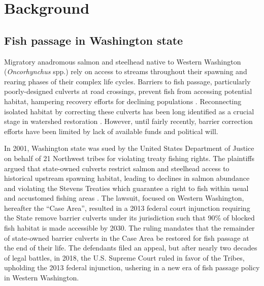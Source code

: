 \documentclass[12pt]{elsarticle}
\begin{document}
\section{Background}

\subsection*{Fish passage in Washington state}

Migratory anadromous salmon and steelhead native to Western Washington (\textit{Oncorhynchus} spp.) rely on access to streams throughout their spawning and rearing phases of their complex life cycles. Barriers to fish passage, particularly poorly-designed culverts at road crossings, prevent fish from accessing potential habitat, hampering recovery efforts for declining populations \citep{noauthor_2020_2020}. Reconnecting isolated habitat by correcting these culverts has been long identified as a crucial stage in watershed restoration \citep{roni_review_2002}. However, until fairly recently, barrier correction efforts have been limited by lack of available funds and political will. 

In 2001, Washington state was sued by the United States Department of Justice on behalf of 21 Northwest tribes for violating treaty fishing rights. The plaintiffs argued that state-owned culverts restrict salmon and steelhead access to historical upstream spawning habitat, leading to declines in salmon abundance and violating the Stevens Treaties which guarantee a right to fish within usual and accustomed fishing areas \citep{hickey_highway_2018}. The lawsuit, focused on Western Washington, hereafter the ``Case Area'', resulted in a 2013 federal court injunction requiring the State remove barrier culverts under its jurisdiction such that 90\% of blocked fish habitat is made accessible by 2030. The ruling mandates that the remainder of state-owned barrier culverts in the Case Area be restored for fish passage at the end of their life. The defendants filed an appeal, but after nearly two decades of legal battles, in 2018, the U.S. Supreme Court ruled in favor of the Tribes, upholding the 2013 federal injunction, ushering in a new era of fish passage policy in Western Washington. 
\end{document}
